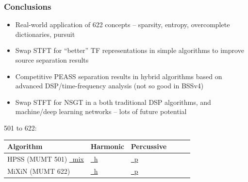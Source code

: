 \documentclass{beamer}
\begin{document}
\begin{frame}
	\frametitle{Conclusions}
	\begin{itemize}
		\item
			Real-world application of 622 concepts -- sparsity, entropy, overcomplete dictionaries, pursuit
		\item
			Swap STFT for ``better'' TF representations in simple algorithms to improve source separation results
		\item
			Competitive PEASS separation results in hybrid algorithms based on advanced DSP/time-frequency analysis (not so good in BSSv4)
		\item
			Swap STFT for NSGT in a both traditional DSP algorithms, and machine/deep learning networks -- lots of future potential
	\end{itemize}
	501 to 622:
	\begin{table}[ht]
	\centering
	\begin{tabular}{lll c c c}
		\hline\hline
		Algorithm & Harmonic & Percussive \\ [0.5ex]
		\hline\hline
		HPSS (MUMT 501) \href{run:./elmestizo.wav}{\faVolumeUp \ mix} & \href{run:./elmestizo_harm_501.wav}{\faVolumeUp \ h} & \href{run:./elmestizo_perc_501.wav}{\faVolumeUp \ p} \\ [0.5ex]
		MiXiN (MUMT 622) & \href{run:./elmestizo_harm_622.wav}{\faVolumeUp \ h} & \href{run:./elmestizo_perc_622.wav}{\faVolumeUp \ p} \\ [0.5ex]
		\hline
	\end{tabular}
	\end{table}
\end{frame}
\end{document}
